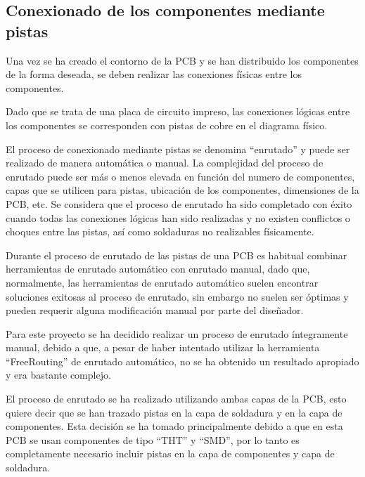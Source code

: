 \subsection{Conexionado de los componentes mediante pistas}
\label{ap:5.4.5}
Una vez se ha creado el contorno de la \ac{PCB} y se han distribuido los componentes de la forma deseada, se deben realizar las conexiones físicas entre los componentes.

Dado que se trata de una placa de circuito impreso, las conexiones lógicas entre los componentes se corresponden con pistas de cobre en el diagrama físico.

El proceso de conexionado mediante pistas se denomina ``enrutado'' y puede ser realizado de manera automática o manual. La complejidad del proceso de enrutado puede ser más o menos elevada en función del numero de componentes, capas que se utilicen para pistas, ubicación de los componentes, dimensiones de la \ac{PCB}, etc. Se considera que el proceso de enrutado ha sido completado con éxito cuando todas las conexiones lógicas han sido realizadas y no existen conflictos o choques entre las pistas, así como soldaduras no realizables físicamente.

Durante el proceso de enrutado de las pistas de una \ac{PCB} es habitual combinar herramientas de enrutado automático con enrutado manual, dado que, normalmente, las herramientas de enrutado automático suelen encontrar soluciones exitosas al proceso de enrutado, sin embargo no suelen ser óptimas y pueden requerir alguna modificación manual por parte del diseñador. 

Para este proyecto se ha decidido realizar un proceso de enrutado íntegramente manual, debido a que, a pesar de haber intentado utilizar la herramienta ``FreeRouting'' de enrutado automático, no se ha obtenido un resultado apropiado y era bastante complejo.

El proceso de enrutado se ha realizado utilizando ambas capas de la \ac{PCB}, esto quiere decir que se han trazado pistas en la capa de soldadura y en la capa de componentes. Esta decisión se ha tomado principalmente debido a que en esta \ac{PCB} se usan componentes de tipo ``\ac{THT}'' y ``\ac{SMD}'', por lo tanto es completamente necesario incluir pistas en la capa de componentes y capa de soldadura.

